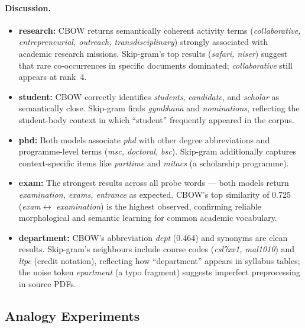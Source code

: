 \documentclass[12pt,a4paper]{article}
\begin{document}
\paragraph{Discussion.}
\begin{itemize}[leftmargin=1.4em]
    \item \textbf{research:} CBOW returns semantically coherent activity terms
          (\textit{collaborative, entrepreneurial, outreach, transdisciplinary})
          strongly associated with academic research missions. Skip-gram's top
          results (\textit{safari, niser}) suggest that rare co-occurrences in
          specific documents dominated; \textit{collaborative} still appears at
          rank~4.

    \item \textbf{student:} CBOW correctly identifies \textit{students},
          \textit{candidate}, and \textit{scholar} as semantically close.
          Skip-gram finds \textit{gymkhana} and \textit{nominations}, reflecting
          the student-body context in which ``student'' frequently appeared in
          the corpus.

    \item \textbf{phd:} Both models associate \textit{phd} with other degree
          abbreviations and programme-level terms (\textit{msc, doctoral, bsc}).
          Skip-gram additionally captures context-specific items like
          \textit{parttime} and \textit{mitacs} (a scholarship programme).

    \item \textbf{exam:} The strongest results across all probe words --- both
          models return \textit{examination, exams, entrance} as expected.
          CBOW's top similarity of 0.725 (\textit{exam}$\leftrightarrow$%
          \textit{examination}) is the highest observed, confirming reliable
          morphological and semantic learning for common academic vocabulary.

    \item \textbf{department:} CBOW's abbreviation \textit{dept} (0.464) and
          synonyms are clean results. Skip-gram's neighbours include course
          codes (\textit{csl7xx1, mal1010}) and \textit{ltpc} (credit notation),
          reflecting how ``department'' appears in syllabus tables; the noise
          token \textit{epartment} (a typo fragment) suggests imperfect
          preprocessing in source PDFs.
\end{itemize}

\subsection{Analogy Experiments}
\end{document}
